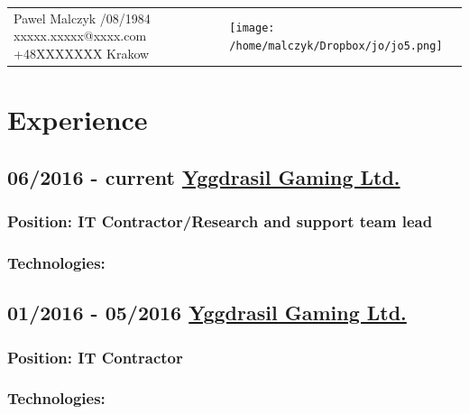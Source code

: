 \documentclass[a4paper]{article}
\begin{document}
\begin{tabular}{  >{\raggedright\arraybackslash}m{10cm}    >{\centering\arraybackslash}m{4cm}  } 
	Pawel Malczyk \newline 21/08/1984 \newline xxxxx.xxxxx@xxxx.com \newline +48XXXXXXX \newline Krakow \newline & \texttt{[image: /home/malczyk/Dropbox/jo/jo5.png]} 
\end{tabular}

\section*{\LARGE{Experience}\newline} 

\subsection*{06/2016 - current \href{http://yggdrasilgaming.com/}{Yggdrasil Gaming Ltd.}}

\subsubsection*{Position:  \textcolor[RGB]{140,140,140}{IT Contractor/Research and support team lead}}

\subsubsection*{Technologies:}

\subsection*{01/2016 - 05/2016 \href{http://yggdrasilgaming.com/}{Yggdrasil Gaming Ltd.}}

\subsubsection*{Position:  \textcolor[RGB]{140,140,140}{IT Contractor}}

\subsubsection*{Technologies:}
\end{document}
